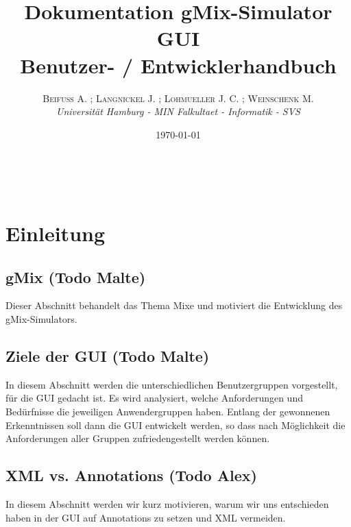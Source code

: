 \documentclass[a4paper, 11pt]{article} %
\title{\textbf{Dokumentation gMix-Simulator GUI}\\ %
Benutzer- / Entwicklerhandbuch} %
\author{\textsc{Beifuß A. ; Langnickel J. ; Lohmueller J. C. ; Weinschenk M.} %
\\{\textit{Universität Hamburg - MIN Falkultaet - Informatik - SVS}}} %
\date{\today} %
\makeatletter
\renewcommand{\maketitle}{ %
\begin{flushright} %
{\LARGE\@title} %

\vspace{50pt} %

{\large\@author} %
\\\@date %

\vspace{40pt} %
\end{flushright}
}
\makeatother
\begin{document}
\maketitle %

 


\tableofcontents


\vspace{30pt} %

\section{Einleitung} %
\label{sec:einleitung}

\subsection{gMix (Todo Malte)} %
\label{sub:gmix}
Dieser Abschnitt behandelt das Thema Mixe und motiviert die Entwicklung des gMix-Simulators.

\subsection{Ziele der GUI (Todo Malte)} %
\label{sub:ziele_der_gui}
In diesem Abschnitt werden die unterschiedlichen Benutzergruppen vorgestellt, für die GUI gedacht ist. Es wird analysiert, welche Anforderungen und Bedürfnisse die jeweiligen Anwendergruppen haben. Entlang der gewonnenen Erkenntnissen soll dann die GUI entwickelt werden, so dass nach Möglichkeit die Anforderungen aller Gruppen zufriedengestellt werden können.

\subsection{XML vs. Annotations (Todo Alex)} %
\label{sub:xml}
In diesem Abschnitt werden wir kurz motivieren, warum wir uns entschieden haben in der GUI auf Annotations zu setzen und XML vermeiden. 
\end{document}
